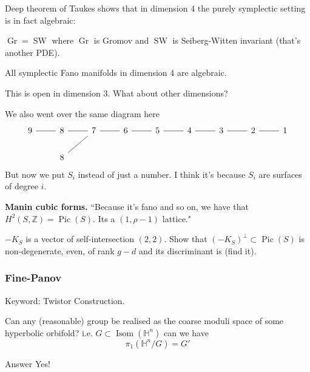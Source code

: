 Deep theorem of Taukes shows that in dimension 4 the purely symplectic setting is in fact algebraic:

\begin{thm}[Taukes]\leavevmode
$\operatorname{Gr}=\operatorname{SW}$ where $\operatorname{Gr}$ is Gromov and $\operatorname{SW}$ is Seiberg-Witten invariant (that's another PDE).
\end{thm}

\begin{coro}\leavevmode
	All symplectic Fano manifolds in dimension 4 are algebraic.
\end{coro}

This is open in dimension 3. What about other dimensions?

We also went over the same diagram here
\[\begin{tikzcd}
				9\arrow[r,no head]&8\arrow[r,no head]&7\arrow[ld,no head]\arrow[r,no head]&6\arrow[r,no head]&5\arrow[r,no head]&4\arrow[r,no head]&3\arrow[r,no head]&2\arrow[r,no head]&1\\
				&8
			\end{tikzcd}\]
But now we put $S_i$ instead of just a number. I think it's because  $S_i$ are surfaces of degree $i$.

{\bfseries Manin cubic forms.}\hspace{.5em} “Because it's fano and so on, we have that $H^{2}(S,\mathbb{Z})=\operatorname{Pic}(S)$. Its a $(1,\rho-1)$ lattice."

\begin{exercise}\leavevmode
	$-K_S$ is a vector of self-intersection  $(2,2)$. Show that $(-K_S)^\perp \subset \operatorname{Pic}(S)$ is non-degenerate, even, of rank $g-d$ and its discriminant is (find it).
\end{exercise}

\subsubsection{Fine-Panov}
Keyword: Twistor Construction.

\begin{question}[Gromov]\leavevmode
	Can any (reasonable) group be realised as the coarse moduli space of some hyperbolic orbifold? i.e. $G\subset\operatorname{I som}(\mathbb{H}^n)$ can we have
	\[\pi_{1}(\mathbb{H}^n/G)=G'\]
\end{question}

\begin{thing4}{Answer}\leavevmode
	Yes!
\end{thing4}

